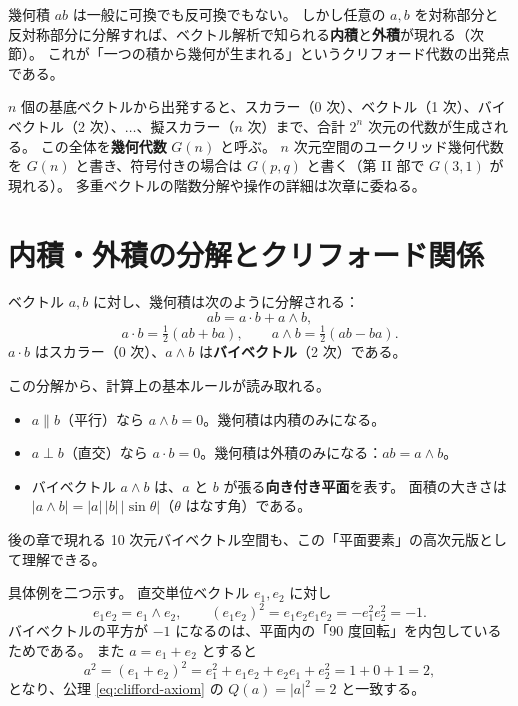 \documentclass[dvipdfmx,a4paper,oneside]{jsbook}
\numberwithin{equation}{chapter}
\begin{document}
幾何積 \(ab\) は一般に可換でも反可換でもない。
しかし任意の \(a,b\) を対称部分と反対称部分に分解すれば、ベクトル解析で知られる\textbf{内積}と\textbf{外積}が現れる（次節）。
これが「一つの積から幾何が生まれる」というクリフォード代数の出発点である。

\(n\) 個の基底ベクトルから出発すると、スカラー（0 次）、ベクトル（1 次）、バイベクトル（2 次）、\(\ldots\)、擬スカラー（\(n\) 次）まで、合計 \(2^n\) 次元の代数が生成される。
この全体を\textbf{幾何代数} \(G(n)\) と呼ぶ。
\(n\) 次元空間のユークリッド幾何代数を \(G(n)\) と書き、符号付きの場合は \(G(p,q)\) と書く（第 II 部で \(G(3,1)\) が現れる）。
多重ベクトルの階数分解や操作の詳細は次章に委ねる。

\section{内積・外積の分解とクリフォード関係}

ベクトル \(a,b\) に対し、幾何積は次のように分解される：
\begin{equation}
  ab = a\cdot b + a\wedge b,
  \label{eq:gp-decomp}
\end{equation}
\begin{equation}
  a\cdot b = \tfrac{1}{2}(ab + ba), \qquad
  a\wedge b = \tfrac{1}{2}(ab - ba).
  \label{eq:dot-wedge}
\end{equation}
\(a\cdot b\) はスカラー（0 次）、\(a\wedge b\) は\textbf{バイベクトル}（2 次）である。

この分解から、計算上の基本ルールが読み取れる。
\begin{itemize}[leftmargin=2em]
  \item \(a \parallel b\)（平行）なら \(a\wedge b = 0\)。幾何積は内積のみになる。
  \item \(a \perp b\)（直交）なら \(a\cdot b = 0\)。幾何積は外積のみになる：\(ab = a\wedge b\)。
  \item バイベクトル \(a\wedge b\) は、\(a\) と \(b\) が張る\textbf{向き付き平面}を表す。
  面積の大きさは \(|a\wedge b| = |a|\,|b|\,|\sin\theta|\)（\(\theta\) はなす角）である。
\end{itemize}
後の章で現れる 10 次元バイベクトル空間も、この「平面要素」の高次元版として理解できる。

具体例を二つ示す。
直交単位ベクトル \(e_1,e_2\) に対し
\begin{equation}
  e_1 e_2 = e_1 \wedge e_2, \qquad (e_1 e_2)^2 = e_1 e_2 e_1 e_2 = -e_1^2 e_2^2 = -1.
  \label{eq:bivector-square}
\end{equation}
バイベクトルの平方が \(-1\) になるのは、平面内の「90 度回転」を内包しているためである。
また \(a = e_1 + e_2\) とすると
\begin{equation}
  a^2 = (e_1 + e_2)^2 = e_1^2 + e_1 e_2 + e_2 e_1 + e_2^2
       = 1 + 0 + 1 = 2,
\end{equation}
となり、公理 \eqref{eq:clifford-axiom} の \(Q(a) = |a|^2 = 2\) と一致する。
\end{document}
